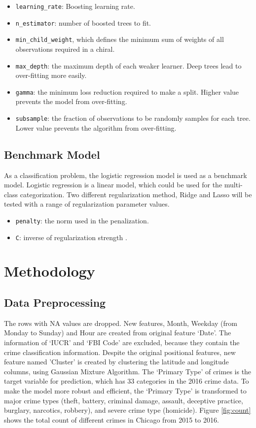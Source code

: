 \documentclass[12pt]{article}
\begin{document}
\begin{itemize}
\item \verb|learning_rate|: Boosting learning rate.
\item \verb|n_estimator|: number of boosted trees to fit.
\item \verb|min_child_weight|, which defines the minimum sum of weights of all observations required in a chiral.
\item \verb|max_depth|: the maximum depth of each weaker learner. Deep trees lead to over-fitting more easily.
\item \verb|gamma|: the minimum loss reduction required to make a split. Higher value prevents the model from over-fitting.
\item \verb|subsample|: the fraction of observations to be randomly samples for each tree. Lower value prevents the algorithm from over-fitting.
\end{itemize}


\subsection{Benchmark Model}
As a classification problem, the logistic regression model is used as a benchmark model. Logistic regression is a linear model, which could be used for the multi-class categorization. Two different regularization method, Ridge and Lasso will be tested with a range of regularization parameter values.
\begin{itemize}
\item \verb|penalty|: the norm used in the penalization.
\item \verb|C|: inverse of regularization strength .
\end{itemize}

\section{Methodology}
\subsection{Data Preprocessing}
The rows with NA values are dropped. New features, Month, Weekday (from Monday to Sunday) and Hour are created from original feature ‘Date’. The information of ‘IUCR’ and ‘FBI Code’ are excluded, because they contain the crime classification information. Despite the original positional features, new feature named 'Cluster' is created by clustering the latitude and longitude columns, using Gaussian Mixture Algorithm. 
The ‘Primary Type’ of crimes is the target variable for prediction, which has 33 categories in the 2016 crime data. To make the model more robust and efficient, the ‘Primary Type’ is transformed to major crime types (theft, battery, criminal damage, assault, deceptive practice, burglary, narcotics, robbery), and severe crime type (homicide). Figure \ref{fig:count} shows the total count of different crimes in Chicago from 2015 to 2016.
\end{document}
